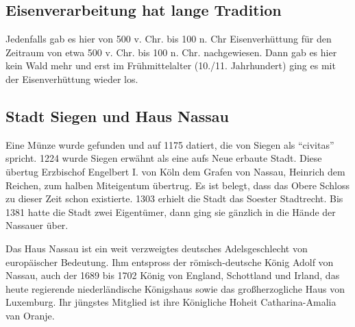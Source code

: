 \documentclass[paper=a4, fontsize=11pt]{scrartcl} %
\numberwithin{equation}{section}		%
\numberwithin{figure}{section}			%
\numberwithin{table}{section}			%
\begin{document}
 \subsection{Eisenverarbeitung hat lange Tradition}
 Jedenfalls gab es hier von 500 v. Chr. bis 100 n. Chr  Eisenverhüttung für den Zeitraum von etwa 500 v. Chr. bis 100 n. Chr. nachgewiesen. Dann gab es hier kein Wald mehr und erst im Frühmittelalter (10./11. Jahrhundert) ging es mit der Eisenverhüttung wieder los.\par
 
 \subsection{Stadt Siegen und Haus Nassau}
 Eine Münze wurde gefunden und auf 1175 datiert, die von Siegen als \enquote{civitas} spricht. 1224 wurde Siegen erwähnt als eine aufs Neue erbaute Stadt. Diese übertug Erzbischof Engelbert I. von Köln dem Grafen von Nassau, Heinrich dem Reichen, zum halben Miteigentum übertrug. Es ist belegt, dass das Obere Schloss zu dieser Zeit schon existierte. 1303 erhielt die Stadt das Soester Stadtrecht. Bis 1381 hatte die Stadt zwei Eigentümer, dann ging sie gänzlich in die Hände der Nassauer über.\par
 Das Haus Nassau ist ein weit verzweigtes deutsches Adelsgeschlecht von europäischer Bedeutung. Ihm entspross der römisch-deutsche König Adolf von Nassau, auch der 1689 bis 1702 König von England, Schottland und Irland, das heute regierende niederländische Königshaus sowie das großherzogliche Haus von Luxemburg. Ihr jüngstes Mitglied ist ihre Königliche Hoheit Catharina-Amalia van Oranje. 
 
\end{document}
